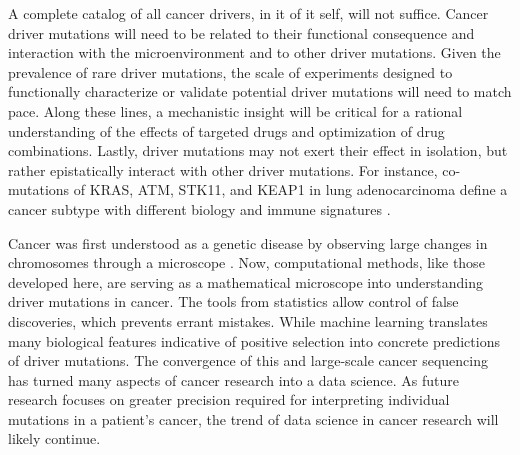 A complete catalog of all cancer drivers, in it of it self, will not suffice. Cancer driver mutations will need to be related to their functional consequence and interaction with the microenvironment and to other driver mutations. Given the prevalence of rare driver mutations, the scale of experiments designed to functionally characterize or validate potential driver mutations will need to match pace. Along these lines, a mechanistic insight will be critical for a rational understanding of the effects of targeted drugs and optimization of drug combinations. Lastly, driver mutations may not exert their effect in isolation, but rather epistatically interact with other driver mutations. For instance, co-mutations of KRAS, ATM, STK11, and KEAP1 in lung adenocarcinoma define a cancer subtype with different biology and immune signatures \cite{RN191}.

Cancer was first understood as a genetic disease by observing large changes in chromosomes through a microscope \cite{RN18}. Now, computational methods, like those developed here, are serving as a mathematical microscope into understanding driver mutations in cancer. The tools from statistics allow control of false discoveries, which prevents errant mistakes. While machine learning translates many biological features indicative of positive selection into concrete predictions of driver mutations. The convergence of this and large-scale cancer sequencing has turned many aspects of cancer research into a data science. As future research focuses on greater precision required for interpreting individual mutations in a patient's cancer, the trend of data science in cancer research will likely continue.
